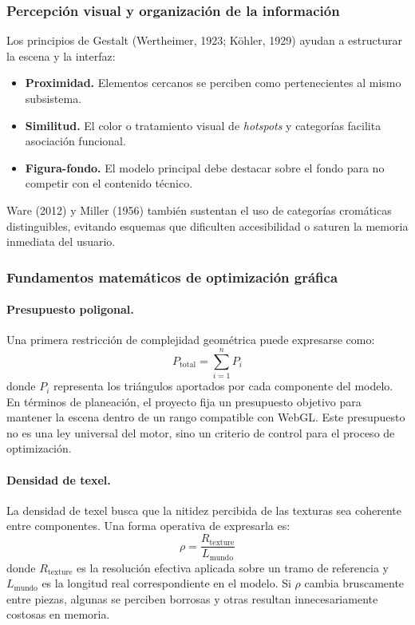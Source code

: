 \subsubsection{Percepci\'on visual y organizaci\'on de la informaci\'on}

Los principios de Gestalt (Wertheimer, 1923; K\"ohler, 1929) ayudan a estructurar la escena y la interfaz:
\begin{itemize}
    \item \textbf{Proximidad.} Elementos cercanos se perciben como pertenecientes al mismo subsistema.
    \item \textbf{Similitud.} El color o tratamiento visual de \textit{hotspots} y categor\'ias facilita asociaci\'on funcional.
    \item \textbf{Figura-fondo.} El modelo principal debe destacar sobre el fondo para no competir con el contenido t\'ecnico.
\end{itemize}

Ware (2012) y Miller (1956) tambi\'en sustentan el uso de categor\'ias crom\'aticas distinguibles, evitando esquemas que dificulten accesibilidad o saturen la memoria inmediata del usuario.

\subsubsection{Fundamentos matem\'aticos de optimizaci\'on gr\'afica}

\paragraph{Presupuesto poligonal.}
Una primera restricci\'on de complejidad geom\'etrica puede expresarse como:
\[
P_{\text{total}} = \sum_{i=1}^{n} P_i
\]
donde $P_i$ representa los tri\'angulos aportados por cada componente del modelo. En t\'erminos de planeaci\'on, el proyecto fija un presupuesto objetivo para mantener la escena dentro de un rango compatible con WebGL. Este presupuesto no es una ley universal del motor, sino un criterio de control para el proceso de optimizaci\'on.

\paragraph{Densidad de texel.}
La densidad de texel busca que la nitidez percibida de las texturas sea coherente entre componentes. Una forma operativa de expresarla es:
\[
\rho = \frac{R_{\text{texture}}}{L_{\text{mundo}}}
\]
donde $R_{\text{texture}}$ es la resoluci\'on efectiva aplicada sobre un tramo de referencia y $L_{\text{mundo}}$ es la longitud real correspondiente en el modelo. Si $\rho$ cambia bruscamente entre piezas, algunas se perciben borrosas y otras resultan innecesariamente costosas en memoria.

